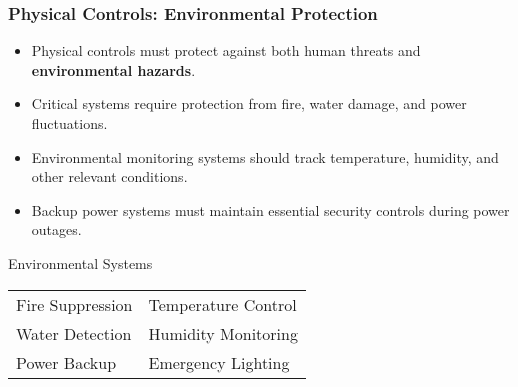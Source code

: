 \documentclass{beamer}
\begin{document}
\begin{frame}
    \frametitle{Physical Controls: Environmental Protection}
    
    \begin{itemize}
        \item Physical controls must protect against both human threats and \textbf{environmental hazards}.
        
        \item Critical systems require protection from fire, water damage, and power fluctuations.
        
        \item Environmental monitoring systems should track temperature, humidity, and other relevant conditions.
        
        \item Backup power systems must maintain essential security controls during power outages.
    \end{itemize}
    
    \begin{block}{Environmental Systems}
        \begin{tabular}{ll}
            Fire Suppression & Temperature Control \\
            Water Detection & Humidity Monitoring \\
            Power Backup & Emergency Lighting \\
        \end{tabular}
    \end{block}
\end{frame}
\end{document}
